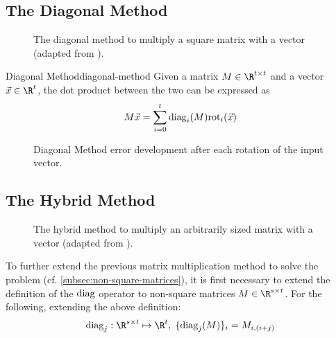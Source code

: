 \subsection{The Diagonal Method}
\begin{figure}[H]
  \centering
  \caption[Diagonal matrix multiplication method]{The diagonal method to multiply a square matrix with a vector (adapted from \cite{2018-gazelle}).}
\end{figure}


\begin{theorem}{Diagonal Method}{diagonal-method}
  Given a matrix $M \in \R^{t \times t}$ and a vector $\vec{x} \in \R^t$,
  the dot product between the two can be expressed as
  \begin{equation*}
    M \vec{x} = \sum_{i=0}^t \mathrm{diag}_i(M) \mathrm{rot}_i(\vec{x})
  \end{equation*}
\end{theorem}

\begin{figure}[H]
  \centering
  \pgfplotsset{/pgfplots/group/.cd,vertical sep=2.0cm}
  \caption[Error development after rotations of the diagonal method]{Diagonal Method error development after each rotation of the input vector.}
  \label{fig:rotation-error}
\end{figure}


\subsection{The Hybrid Method}
\begin{figure}[H]
  \centering
  \caption[Hybrid matrix multiplication method]{The hybrid method to multiply an arbitrarily sized matrix with a vector (adapted from \cite{2018-gazelle}).}
\end{figure}
To further extend the previous matrix multiplication method to solve the problem
(cf. \autoref{subsec:non-square-matrices}), it is first necessary to extend the definition of the $\mathrm{diag}$ operator to non-square matrices $M \in \R^{s \times t}$.
For the following, extending the above definition:
$$\diag_j: \R^{s \times t} \mapsto \R^t, \; \{\diag_j(M)\}_i = M_{i, (i+j)}$$

